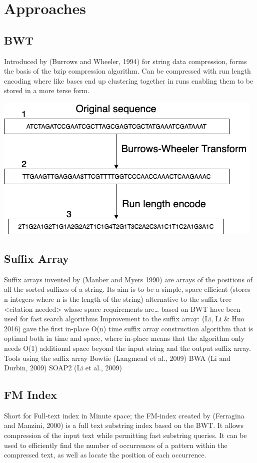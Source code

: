 \documentclass[11pt]{article}
\begin{document}
\section{Approaches}
\label{sec:org7751a48}
\subsection{BWT}
\label{sec:orgbb9fc2e}
Introduced by (Burrows and Wheeler, 1994) for string data compression, forms the basis of the bzip compression algorithm.
Can be compressed with run length encoding where like bases end up clustering together in runs enabling them to be stored in a more terse form.

\begin{center}
\includegraphics[width=.9\linewidth]{./assets/images/Run Length Encoding.png}
\end{center}

\subsection{Suffix Array}
\label{sec:org5f07f45}
Suffix arrays invented by (Manber and Myers 1990) are arrays of the positions of all the sorted suffixes of a string. Its aim is to be a simple, space efficient (stores n integers where n is the length of the string) alternative to the suffix tree <citation needed> whose space requirements are\ldots{}
based on BWT have been used for fast search algorithms
Improvement to the suffix array: (Li, Li \& Huo 2016) gave the first in-place  O(n) time suffix array construction algorithm that is optimal both in time and space, where in-place means that the algorithm only needs O(1) additional space beyond the input string and the output suffix array.
Tools using the suffix array
Bowtie (Langmead et al., 2009)
BWA (Li and Durbin, 2009)
SOAP2 (Li et al., 2009)

\subsection{FM Index}
\label{sec:org293f541}
Short for Full-text index in Minute space; the FM-index created by (Ferragina and Manzini, 2000) is a full text substring index based on the BWT. It allows compression of the input text while permitting fast substring queries.
It can be used to efficiently find the number of occurrences of a pattern within the compressed text, as well as locate the position of each occurrence.
\end{document}

